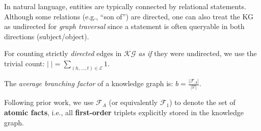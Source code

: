            In natural language, entities are typically connected by relational statements. Although some relations (e.g., ``son of'') are directed, one can also treat the KG as undirected for \emph{graph traversal} since a statement is often queryable in both directions (subject/object).
        
            \begin{definition}
                \label{def:norm_over_edges}
                For counting strictly \emph{directed} edges in \(\mathcal{KG}\) \emph{as if} they were undirected, we use the trivial count:
                \(|\;| = \sum_{(h, \dots, t) \in \mathcal{E}} 1.\)
            \end{definition}
        
            \begin{definition}
                \label{def:branching_factor}
                The \emph{average branching factor} of a knowledge graph is:
                \(b = \frac{|\mathcal{F}_A|}{|\mathcal{V}|}\).
            \end{definition}
            
            \begin{definition}
                \label{def:atomic_facts}
                Following prior work, we use \(\mathcal{F}_A\) (or equivalently \(\mathcal{F}_1\)) to denote the set of \textbf{atomic facts}, i.e., all \textbf{first-order} triplets explicitly stored in the knowledge graph.
            \end{definition}
        
